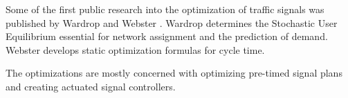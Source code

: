 \label{history}
Some of the first public research into the optimization of traffic signals was published by Wardrop \cite{Wardrop} and Webster \cite{Webster}. Wardrop determines the Stochastic User Equilibrium essential for network assignment and the prediction of demand. Webster develops static optimization formulas for cycle time.

The optimizations are mostly concerned with optimizing pre-timed signal plans and creating actuated signal controllers.